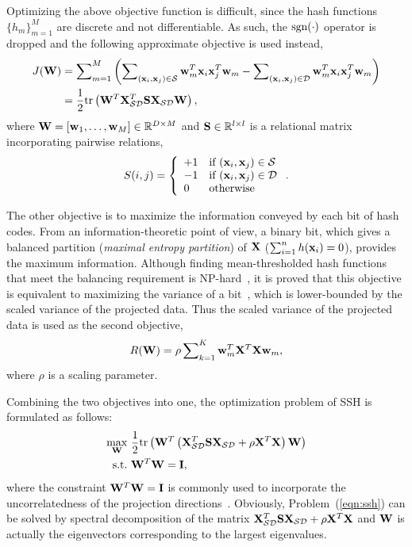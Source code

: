 Optimizing the above objective function is difficult, since the hash functions $\{h_m\}_{m=1}^M$ are discrete and not differentiable. As such, the $\sgn(\cdot)$ operator is dropped and the following approximate objective is used instead,
\begin{align}
J(\W) &= \sum\nolimits_{m=1}\nolimits^M\left(\sum\nolimits_{(\x_i,\x_j)\in\mathcal{S}}\w_m^T\x_i\x_j^{T}\w_m - \sum\nolimits_{(\x_i,\x_j)\in\mathcal{D}}\w_m^T\x_i\x_j^{T}\w_m\right)\nonumber\\
&= \frac{1}{2}\tr\left(\W^{T}\X_{\mathcal{SD}}^{T}\S\X_{\mathcal{SD}}\W\right),\nonumber
\end{align}
where $\W = [\w_1,\dots,\w_M] \in \mathbb{R}^{D \times M}$ and $\S\in \mathbb{R}^{l\times l}$ is a relational matrix incorporating pairwise relations,
\begin{align}
S(i,j) = \left\{ \begin{array}{ll}
+1 & \mbox{if } (\x_i,\x_j)\in\mathcal{S}\\
-1 & \mbox{if } (\x_i,\x_j)\in\mathcal{D}\\
0 & \textrm{otherwise}
\end{array} \right..\nonumber
\end{align}

The other objective is to maximize the information conveyed by each bit of hash codes. From an information-theoretic point of view, a binary bit, which gives a balanced partition (\textit{maximal entropy partition}) of $\X$ ($\sum_{i=1}^{n}h(\x_i) = 0$), provides the maximum information. Although finding mean-thresholded hash functions that meet the balancing requirement is \mbox{NP-hard}~\cite{weiss2008nips}, it is proved that this objective is equivalent to maximizing the variance of a bit~\cite{wang2010cvpr}, which is lower-bounded by the scaled variance of the projected data. Thus the scaled variance of the projected data is used as the second objective,
\begin{align}
R(\W) = \rho\sum\nolimits_{k=1}\nolimits^{K}\w_m^T\X^T\X\w_m,\nonumber
\end{align}
where $\rho$ is a scaling parameter.

Combining the two objectives into one, the optimization problem of \mbox{SSH} is formulated as follows:
\begin{align}
\label{eqn:ssh}
\max_{\W} & ~\frac{1}{2}\tr\left(\W^{T}\left(\X_{\mathcal{SD}}^{T}\S\X_{\mathcal{SD}}+\rho\X^{T}\X\right)\W\right)\\
\subto & ~\W^T\W = \I,\nonumber
\end{align}
where the constraint $\W^T\W = \I$ is commonly used to incorporate the uncorrelatedness of the projection directions~\cite{weiss2008nips}. Obviously, Problem~(\ref{eqn:ssh}) can be solved by spectral decomposition of the matrix $\X_{\mathcal{SD}}^{T}\S\X_{\mathcal{SD}}+\rho\X^{T}\X$ and $\W$ is actually the eigenvectors corresponding to the largest eigenvalues.

